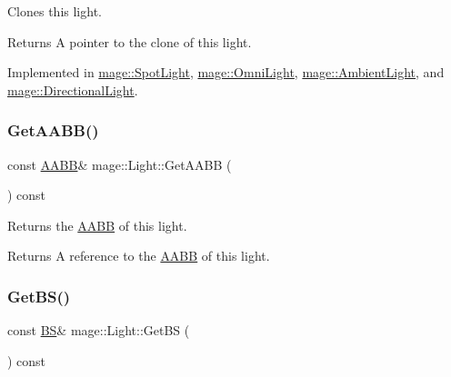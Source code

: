 Clones this light.

\begin{DoxyReturn}{Returns}
A pointer to the clone of this light. 
\end{DoxyReturn}


Implemented in \hyperlink{classmage_1_1_spot_light_a060044ae1de97143878ad26524f03709}{mage\+::\+Spot\+Light}, \hyperlink{classmage_1_1_omni_light_a1212457828cdd96cc7170767b7bd1223}{mage\+::\+Omni\+Light}, \hyperlink{classmage_1_1_ambient_light_a7223a4770653c20e662810b0956c6e51}{mage\+::\+Ambient\+Light}, and \hyperlink{classmage_1_1_directional_light_a122d3dcd7633a85ef8a85e7d768da36d}{mage\+::\+Directional\+Light}.

\hypertarget{classmage_1_1_light_a1ce1d4a97857b182e629e0e546beb280}{}\label{classmage_1_1_light_a1ce1d4a97857b182e629e0e546beb280} 
\subsubsection{\texorpdfstring{Get\+A\+A\+B\+B()}{GetAABB()}}
{\footnotesize\ttfamily const \hyperlink{structmage_1_1_a_a_b_b}{A\+A\+BB}\& mage\+::\+Light\+::\+Get\+A\+A\+BB (\begin{DoxyParamCaption}{ }\end{DoxyParamCaption}) const\hspace{0.3cm}{\ttfamily [noexcept]}}

Returns the \hyperlink{structmage_1_1_a_a_b_b}{A\+A\+BB} of this light.

\begin{DoxyReturn}{Returns}
A reference to the \hyperlink{structmage_1_1_a_a_b_b}{A\+A\+BB} of this light. 
\end{DoxyReturn}
\hypertarget{classmage_1_1_light_ab2365a76f8f3a2ae2c97263ea556a993}{}\label{classmage_1_1_light_ab2365a76f8f3a2ae2c97263ea556a993} 
\subsubsection{\texorpdfstring{Get\+B\+S()}{GetBS()}}
{\footnotesize\ttfamily const \hyperlink{structmage_1_1_b_s}{BS}\& mage\+::\+Light\+::\+Get\+BS (\begin{DoxyParamCaption}{ }\end{DoxyParamCaption}) const\hspace{0.3cm}{\ttfamily [noexcept]}}

